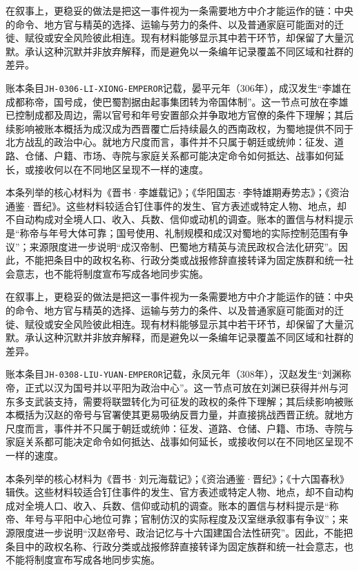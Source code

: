 在叙事上，更稳妥的做法是把这一事件视为一条需要地方中介才能运作的链：中央的命令、地方官与精英的选择、运输与劳力的条件、以及普通家庭可能面对的迁徙、赋役或安全风险彼此相连。现有材料能够显示其中若干环节，却保留了大量沉默。承认这种沉默并非放弃解释，而是避免以一条编年记录覆盖不同区域和社群的差异。

账本条目\texttt{JH-0306-LI-XIONG-EMPEROR}记载，晏平元年（306年），成汉发生“李雄在成都称帝，国号成，使巴蜀割据由起事集团转为帝国体制”。这一节点可放在李雄已控制成都及周边，需以官号和年号安置部众并争取地方官僚的条件下理解；其后续影响被账本概括为成汉成为西晋覆亡后持续最久的西南政权，为蜀地提供不同于北方战乱的政治中心。就地方尺度而言，事件并不只属于朝廷或统帅：征发、道路、仓储、户籍、市场、寺院与家庭关系都可能决定命令如何抵达、战事如何延长，或接收何以在不同地区呈现不一样的速度。

本条列举的核心材料为《晋书·李雄载记》；《华阳国志·李特雄期寿势志》；《资治通鉴·晋纪》。这些材料较适合钉住事件的发生、官方表述或特定人物、地点，却不自动构成对全境人口、收入、兵数、信仰或动机的调查。账本的置信与材料提示是“称帝与年号大体可靠；国号使用、礼制规模和成汉对蜀地的实际控制范围有争议”；来源限度进一步说明“成汉帝制、巴蜀地方精英与流民政权合法化研究”。因此，不能把条目中的政权名称、行政分类或战报修辞直接转译为固定族群和统一社会意志，也不能将制度宣布写成各地同步实施。

在叙事上，更稳妥的做法是把这一事件视为一条需要地方中介才能运作的链：中央的命令、地方官与精英的选择、运输与劳力的条件、以及普通家庭可能面对的迁徙、赋役或安全风险彼此相连。现有材料能够显示其中若干环节，却保留了大量沉默。承认这种沉默并非放弃解释，而是避免以一条编年记录覆盖不同区域和社群的差异。

账本条目\texttt{JH-0308-LIU-YUAN-EMPEROR}记载，永凤元年（308年），汉赵发生“刘渊称帝，正式以汉为国号并以平阳为政治中心”。这一节点可放在刘渊已获得并州与河东多支武装支持，需要将联盟转化为可征发的政权的条件下理解；其后续影响被账本概括为汉赵的帝号与官署使其更易吸纳反晋力量，并直接挑战西晋正统。就地方尺度而言，事件并不只属于朝廷或统帅：征发、道路、仓储、户籍、市场、寺院与家庭关系都可能决定命令如何抵达、战事如何延长，或接收何以在不同地区呈现不一样的速度。

本条列举的核心材料为《晋书·刘元海载记》；《资治通鉴·晋纪》；《十六国春秋》辑佚。这些材料较适合钉住事件的发生、官方表述或特定人物、地点，却不自动构成对全境人口、收入、兵数、信仰或动机的调查。账本的置信与材料提示是“称帝、年号与平阳中心地位可靠；官制仿汉的实际程度及汉室继承叙事有争议”；来源限度进一步说明“汉赵帝号、政治记忆与十六国建国合法性研究”。因此，不能把条目中的政权名称、行政分类或战报修辞直接转译为固定族群和统一社会意志，也不能将制度宣布写成各地同步实施。

